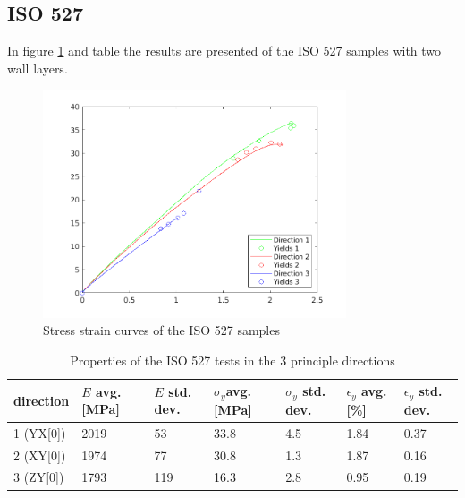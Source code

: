 \subsection{ISO 527}
In figure \ref{fig:ISO527results} and table \label{tab:ISO527results} the results are presented of the ISO 527 samples with two wall layers.
\begin{figure}[H]
    \centering
    \includegraphics[width=0.80\textwidth]{chapter_5_Experimentaltesting/figures/ISOTensiletests.png}
    \caption{Stress strain curves of the ISO 527 samples}
    \label{fig:ISO527results}
\end{figure}

\begin{table}[ht]
\centering
\caption{Properties of the ISO 527 tests in the 3 principle directions}
          \label{tab:ISO527results}
\begin{tabular}{ p{1.5cm}p{1cm}p{1cm}p{1cm}p{1cm}p{1cm}p{1cm}  }
\hline
direction & $E$ avg. [MPa] & $E$ std. dev. & $\sigma_y$avg. [MPa] & $\sigma_y$ std. dev. & $\epsilon_y$ avg. [\%] & $\epsilon_y$   std. dev. \\
 \hline
1 (YX[0]) & 2019 & 53 & 33.8 & 4.5 & 1.84 & 0.37 \\
2 (XY[0]) & 1974 & 77 & 30.8 & 1.3 & 1.87 & 0.16 \\
3 (ZY[0]) & 1793 & 119 & 16.3 & 2.8 & 0.95 & 0.19\\
 \hline
\end{tabular}
\end{table}



